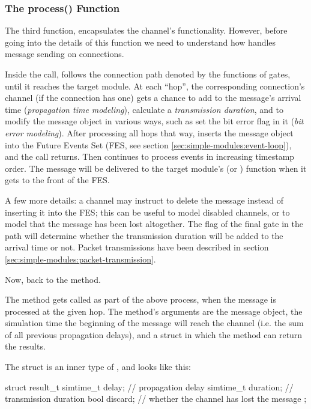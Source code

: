 \subsubsection{The process() Function}

The third function,  encapsulates the channel's
functionality. However, before going into the details of this function
we need to understand how {\opp} handles message sending on connections.

Inside the  call, {\opp} follows the
connection path denoted by the  functions of gates,
until it reaches the target module. At each ``hop'', the corresponding
connection's channel (if the connection has one) gets a chance to add to
the message's arrival time (\textit{propagation time modeling}), calculate a
\textit{transmission duration}, and to modify the message object in various
ways, such as set the bit error flag in it (\textit{bit error modeling}).
After processing all hops that way, {\opp} inserts the message object
into the Future Events Set (FES, see section
\ref{sec:simple-modules:event-loop}), and the  call returns.
Then {\opp} continues to process events in increasing timestamp order.
The message will be delivered to the target module's 
(or ) function when it gets to the front of the FES.

A few more details: a channel may instruct {\opp} to delete the message
instead of inserting it into the FES; this can be useful to model
disabled channels, or to model that the message has been lost altogether.
The  flag of the final gate in the path
will determine whether the transmission duration will be added to the
arrival time or not. Packet transmissions have been described in section
\ref{sec:simple-modules:packet-transmission}.

Now, back to the  method.

The method gets called as part of the above process, when the message
is processed at the given hop. The method's arguments are the message
object, the simulation time the beginning of the message will reach
the channel (i.e. the sum of all previous propagation delays),
and a struct in which the method can return the results.

The  struct is an inner type of ,
and looks like this:

\begin{cpp}
struct result_t {
    simtime_t delay;     // propagation delay
    simtime_t duration;  // transmission duration
    bool discard;        // whether the channel has lost the message
};
\end{cpp}

